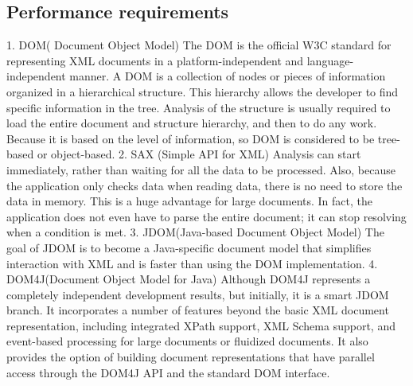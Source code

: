 


\subsection{Performance requirements}
1. DOM( Document Object Model)
The DOM is the official W3C standard for representing XML documents in a platform-independent and language-independent manner. A DOM is a collection of nodes or pieces of information organized in a hierarchical structure. This hierarchy allows the developer to find specific information in the tree. Analysis of the structure is usually required to load the entire document and structure hierarchy, and then to do any work. Because it is based on the level of information, so DOM is considered to be tree-based or object-based.
2. SAX (Simple API for XML)
Analysis can start immediately, rather than waiting for all the data to be processed. Also, because the application only checks data when reading data, there is no need to store the data in memory. This is a huge advantage for large documents. In fact, the application does not even have to parse the entire document; it can stop resolving when a condition is met.
3. JDOM(Java-based Document Object Model)
The goal of JDOM is to become a Java-specific document model that simplifies interaction with XML and is faster than using the DOM implementation.
4. DOM4J(Document Object Model for Java)
Although DOM4J represents a completely independent development results, but initially, it is a smart JDOM branch. It incorporates a number of features beyond the basic XML document representation, including integrated XPath support, XML Schema support, and event-based processing for large documents or fluidized documents. It also provides the option of building document representations that have parallel access through the DOM4J API and the standard DOM interface. 

